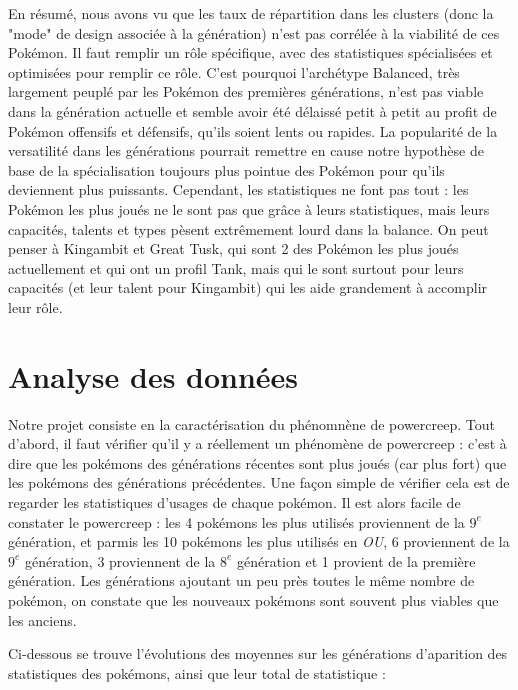 \documentclass[a4paper,12pt]{article}
\begin{document}
En résumé, nous avons vu que les taux de répartition dans les clusters (donc la "mode" de design associée à la génération) n'est pas corrélée à la viabilité de ces Pokémon. Il faut remplir un rôle spécifique, avec des statistiques spécialisées et optimisées pour remplir ce rôle. C'est pourquoi l'archétype Balanced, très largement peuplé par les Pokémon des premières générations, n'est pas viable dans la génération actuelle et semble avoir été délaissé petit à petit au profit de Pokémon offensifs et défensifs, qu'ils soient lents ou rapides. La popularité de la versatilité dans les générations pourrait remettre en cause notre hypothèse de base de la spécialisation toujours plus pointue des Pokémon pour qu'ils deviennent plus puissants. Cependant, les statistiques ne font pas tout : les Pokémon les plus joués ne le sont pas que grâce à leurs statistiques, mais leurs capacités, talents et types pèsent extrêmement lourd dans la balance. On peut penser à Kingambit et Great Tusk, qui sont 2 des Pokémon les plus joués actuellement et qui ont un profil Tank, mais qui le sont surtout pour leurs capacités (et leur talent pour Kingambit) qui les aide grandement à accomplir leur rôle.

\section{Analyse des données}

Notre projet consiste en la caractérisation du phénomnène de powercreep. Tout
d'abord, il faut vérifier qu'il y a réellement un phénomène de powercreep :
c'est à dire que les pokémons des générations récentes sont plus joués (car plus
fort) que les pokémons des générations précédentes. Une façon simple de vérifier
cela est de regarder les statistiques d'usages de chaque pokémon. Il est alors
facile de constater le powercreep : les 4 pokémons les plus utilisés proviennent
de la $9^{e}$ génération, et parmis les 10 pokémons les plus utilisés en
\textit{OU}, 6 proviennent de la $9^{e}$ génération, 3 proviennent de la $8^{e}$
génération et 1 provient de la première génération. Les générations ajoutant un
peu près toutes le même nombre de pokémon, on constate que les nouveaux pokémons
sont souvent plus viables que les anciens.


Ci-dessous se trouve l'évolutions des moyennes sur les générations d'aparition
des statistiques des pokémons, ainsi que leur total de statistique :
\end{document}
